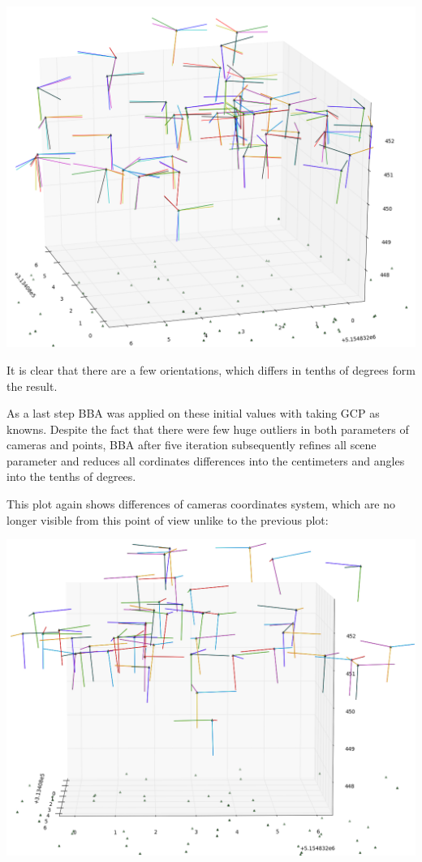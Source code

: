\documentclass[a4paper,12pt]{article}
\begin{document}
\includegraphics[scale=0.35]{figures/angles_comaprison_relative_orinetaion.png}

It is clear that there are a few orientations, which differs in tenths of degrees form the result. 

As a last step BBA was applied on these initial values with taking GCP as knowns.
Despite the fact that there were few huge outliers in both parameters of cameras and points,
BBA after five iteration subsequently refines all scene parameter and reduces all cordinates 
differences into the centimeters and angles into the tenths of degrees. 


This plot again shows differences of cameras coordinates system, which are no longer visible from this point of view
unlike to the previous plot:

\includegraphics[scale=0.35]{figures/result.png}
\end{document}
